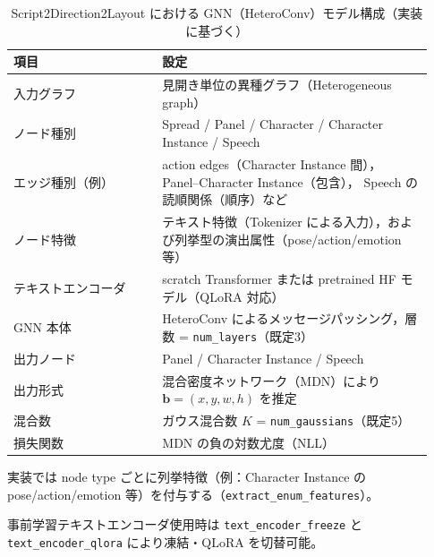 \documentclass[a4j,12pt,dvipdfmx]{jsreport}
\begin{document}
\begin{table}[htbp]
  \centering
  \small
  \begin{threeparttable}
    \caption{Script2Direction2Layout における GNN（HeteroConv）モデル構成（実装に基づく）}
    \label{tab:gnn_arch}
    \begin{tabular}{p{0.33\linewidth} p{0.60\linewidth}}
      \toprule
      \textbf{項目} & \textbf{設定}                                           \\
      \midrule
      入力グラフ       & 見開き単位の異種グラフ（Heterogeneous graph）                      \\
      ノード種別       &
      Spread / Panel / Character / Character Instance / Speech            \\
      エッジ種別（例）    &
      action edges（Character Instance 間），
      Panel--Character Instance（包含），
      Speech の読順関係（順序）など                                                  \\
      ノード特徴       &
      テキスト特徴（Tokenizer による入力），および列挙型の演出属性（pose/action/emotion 等）\tnote{a} \\
      テキストエンコーダ   &
      scratch Transformer または pretrained HF モデル（QLoRA 対応）\tnote{b}        \\
      GNN 本体      &
      HeteroConv によるメッセージパッシング，層数 = \texttt{num\_layers}（既定3）             \\
      出力ノード       &
      Panel / Character Instance / Speech                                 \\
      出力形式        &
      混合密度ネットワーク（MDN）により $\mathbf{b}=(x,y,w,h)$ を推定                       \\
      混合数         &
      ガウス混合数 $K$ = \texttt{num\_gaussians}（既定5）                           \\
      損失関数        &
      MDN の負の対数尤度（NLL）                                                    \\
      \bottomrule
    \end{tabular}
    \begin{tablenotes}[flushleft]
      \footnotesize
      \item[a] 実装では node type ごとに列挙特徴（例：Character Instance の pose/action/emotion 等）を付与する（\texttt{extract\_enum\_features}）。
      \item[b] 事前学習テキストエンコーダ使用時は \texttt{text\_encoder\_freeze} と \texttt{text\_encoder\_qlora} により凍結・QLoRA を切替可能。
    \end{tablenotes}
  \end{threeparttable}
\end{table}
\end{document}

